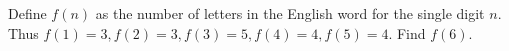Define $ f(n)$ as the number of letters in the English word for the single digit $ n $. Thus $ f(1)=3,f(2)=3,f(3)=5,f(4)=4,f(5)=4 $. Find $ f(6)$.
